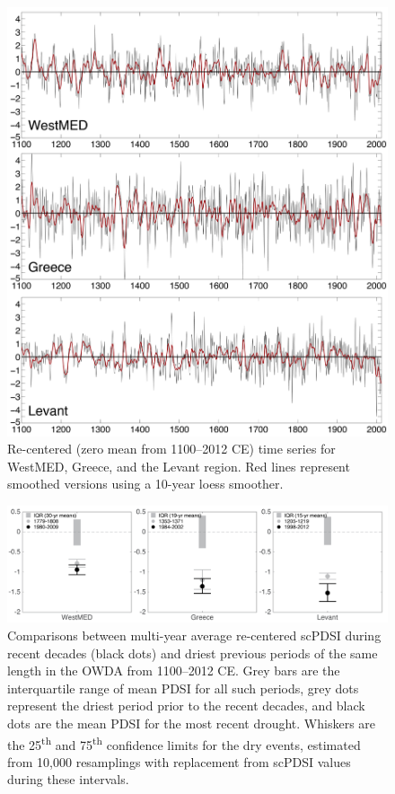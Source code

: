 \documentclass[draft,jgr]{AGUTeX}
\begin{document}
\begin{figure}
\center
\includegraphics[width=0.9\columnwidth]{fig_12_regional_series_MED1.png}
\caption{Re-centered (zero mean from 1100--2012 CE) time series for WestMED, Greece, and the Levant region. Red lines represent smoothed versions using a 10-year loess smoother.}\label{placeholder}
\end{figure}

\begin{figure}
\center
\includegraphics[width=1.0\columnwidth]{fig_13_pdsi_boxplot.png}
\caption{Comparisons between multi-year average re-centered scPDSI during recent decades (black dots) and driest previous periods of the same length in the OWDA from 1100--2012 CE. Grey bars are the interquartile range of mean PDSI for all such periods, grey dots represent the driest period prior to the recent decades, and black dots are the mean PDSI for the most recent drought. Whiskers are the 25\textsuperscript{th} and 75\textsuperscript{th} confidence limits for the dry events, estimated from 10,000 resamplings with replacement from scPDSI values during these intervals.}\label{placeholder}
\end{figure}
\end{document}
